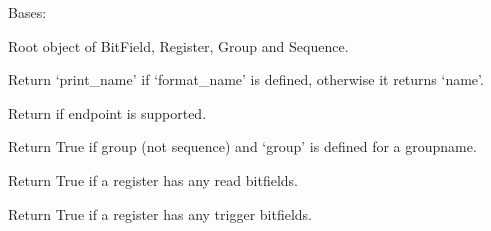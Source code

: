 \documentclass[letterpaper,10pt,english]{sphinxmanual}
\begin{document}
\begin{fulllineitems}
\label{\detokenize{developer:wuppercodegen.classes.Node}}
Bases: 

Root object of BitField, Register, Group and Sequence.

\begin{fulllineitems}
\label{\detokenize{developer:wuppercodegen.classes.Node.full_name}}
Return `print\_name' if `format\_name' is defined, otherwise it returns `name'.

\end{fulllineitems}


\begin{fulllineitems}
\label{\detokenize{developer:wuppercodegen.classes.Node.has_endpoint}}
Return if endpoint is supported.

\end{fulllineitems}


\begin{fulllineitems}
\label{\detokenize{developer:wuppercodegen.classes.Node.has_groupname}}
Return True if group (not sequence) and `group' is defined for a groupname.

\end{fulllineitems}


\begin{fulllineitems}
\label{\detokenize{developer:wuppercodegen.classes.Node.has_read_bitfields}}
Return True if a register has any read bitfields.

\end{fulllineitems}


\begin{fulllineitems}
\label{\detokenize{developer:wuppercodegen.classes.Node.has_trigger_bitfields}}
Return True if a register has any trigger bitfields.


\end{fulllineitems}
\end{fulllineitems}
\end{document}
